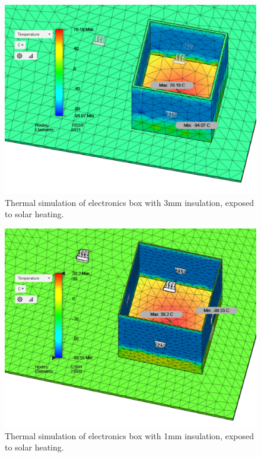 	\begin{figure}[H]
    \centering    	
    \includegraphics[scale=0.6]{4-experiment-design/img/mechanical/3mmthickheat.PNG}
	\caption{Thermal simulation of electronics box with 3mm insulation, exposed to solar heating.}
	\label{fig:3mmthickheat}
	\end{figure}

	\begin{figure}[H]
    \centering  
    \includegraphics[scale=0.65]{4-experiment-design/img/mechanical/1mmthickheat.PNG}
	\caption{Thermal simulation of electronics box with 1mm insulation, exposed to solar heating.}
	\label{fig:1mmthickheat}    
    	\end{figure}
    	
